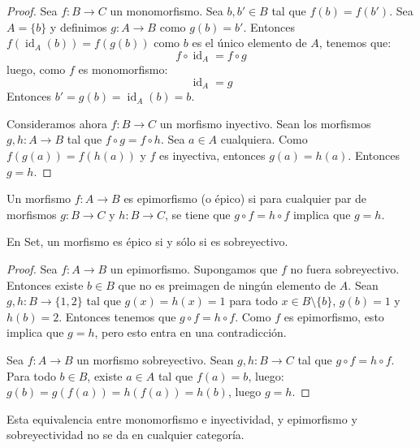 \documentclass[12pt, twoside]{book}
\newcommand{\Set}{{Set}}
\DeclareMathOperator{\id}{id}
\begin{document}
\begin{proof}
Sea $f \colon B \to C$ un monomorfismo. Sea $b, b' \in B$ tal que $f(b) = f(b')$. Sea $A = \{b\}$ y definimos $g \colon A \to B$ como $g(b)=b'$.
Entonces $f(\id_A(b)) = f(g(b))$
como $b$ es el único elemento de $A$, tenemos que:
\[ f \circ \id_A = f \circ g \]
luego, como $f$ es monomorfismo:
\[ \id_A = g \]
Entonces $b'=g(b)=\id_A(b)=b$.

Consideramos ahora $f \colon B \to C$ un morfismo inyectivo.
Sean los morfismos $g, h \colon A \to B$ tal que $f \circ g = f \circ h$.
Sea $a \in A$ cualquiera. Como $f(g(a)) = f(h(a))$ y $f$ es inyectiva, entonces $g(a) = h(a)$.
Entonces $g = h$. 
\end{proof}

\begin{definition}
Un morfismo $f \colon A \to B$ es epimorfismo (o épico) si para cualquier par de morfismos $g \colon B \to C$ y $h \colon B \to C$, se tiene que $g \circ f = h \circ f$ implica que $g = h$.
\end{definition}

\begin{proposition}
En \Set, un morfismo es épico si y sólo si es sobreyectivo.
\end{proposition}

\begin{proof}
Sea $f \colon A \to B$ un epimorfismo. Supongamos que $f$ no fuera sobreyectivo. Entonces existe $b \in B$ que no es preimagen de ningún elemento de $A$. Sean $g, h \colon B \to \{1,2\}$ tal que $g(x)=h(x)=1$ para todo $x \in B \setminus \{b\}$, $g(b) = 1$ y $h(b) = 2$. Entonces tenemos que $g \circ f = h \circ f$. Como $f$ es epimorfismo, esto implica que $g = h$, pero esto entra en una contradicción.

Sea $f \colon A \to B$ un morfismo sobreyectivo. Sean $g, h \colon B \to C$ tal que $g \circ f = h \circ f$. Para todo $b \in B$, existe $a \in A$ tal que $f(a)=b$, luego: $g(b) = g(f(a)) = h(f(a)) = h(b)$, luego $g = h$.
\end{proof}

Esta equivalencia entre monomorfismo e inyectividad, y epimorfismo y sobreyectividad no se da en cualquier categoría.
\end{document}
